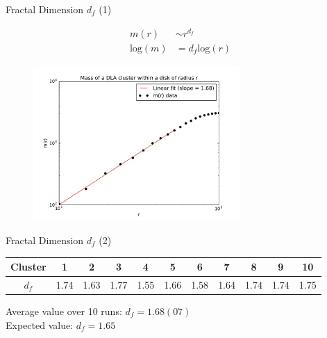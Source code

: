 \documentclass{beamer}
\begin{document}
\begin{frame}{Fractal Dimension $d_f$ (1)}

\begin{align}
m(r) &\sim r^{d_f} \nonumber \\
\text{log}(m)  &= d_f \text{log}(r) \nonumber
\end{align}

\begin{figure}[H]
	\centering
	\includegraphics[width=0.7\textwidth]{mass_vs_R.pdf}
\end{figure}

\end{frame}

\begin{frame}{Fractal Dimension $d_f$ (2)}


\begin{center}
\small
\begin{tabular}{ |c|c|c|c|c|c|c|c|c|c|c| } 
 \hline
Cluster & 1 & 2 & 3 & 4 & 5 & 6 & 7 & 8 & 9 & 10 \\ 
\hline
 $d_f$& 1.74 & 1.63 & 1.77 & 1.55 & 1.66 & 1.58 & 1.64 & 1.74 & 1.74 & 1.75 \\ 
 \hline
\end{tabular}
\end{center}

Average value over 10 runs: $d_f = 1.68(07)$\\
Expected value: $d_f  = 1.65$

\end{frame}




\end{document}
